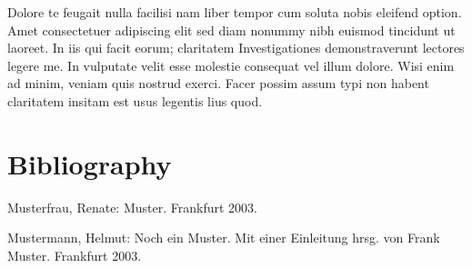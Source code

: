 \documentclass[a4paper,12pt]{scrartcl}
\begin{document}
Dolore te feugait nulla facilisi nam liber tempor cum soluta nobis eleifend option. Amet consectetuer adipiscing elit sed diam nonummy nibh euismod tincidunt ut laoreet. In iis qui facit eorum; claritatem Investigationes demonstraverunt lectores legere me. In vulputate velit esse molestie consequat vel illum dolore. Wisi enim ad minim, veniam quis nostrud exerci. Facer possim assum typi non habent claritatem insitam est usus legentis lius quod.

\newpage

\section{Bibliography}

Musterfrau, Renate: Muster. Frankfurt 2003.


Mustermann, Helmut: Noch ein Muster. Mit einer Einleitung hrsg. von Frank Muster. Frankfurt 2003.
\end{document}
